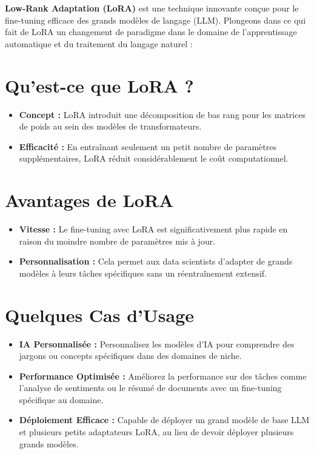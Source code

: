 \documentclass[
  letterpaper,
  DIV=11,
  numbers=noendperiod]{scrreprt}
\providecommand{\tightlist}{%
  \setlength{\itemsep}{0pt}\setlength{\parskip}{0pt}}\usepackage{longtable,booktabs,array}
\begin{document}
\textbf{Low-Rank Adaptation (LoRA)} est une technique innovante conçue
pour le fine-tuning efficace des grands modèles de langage (LLM).
Plongeons dans ce qui fait de LoRA un changement de paradigme dans le
domaine de l'apprentissage automatique et du traitement du langage
naturel :

\section{Qu'est-ce que LoRA ?}\label{quest-ce-que-lora}

\begin{itemize}
\tightlist
\item
  \textbf{Concept :} LoRA introduit une décomposition de bas rang pour
  les matrices de poids au sein des modèles de transformateurs.
\item
  \textbf{Efficacité :} En entraînant seulement un petit nombre de
  paramètres supplémentaires, LoRA réduit considérablement le coût
  computationnel.
\end{itemize}

\section{Avantages de LoRA}\label{avantages-de-lora}

\begin{itemize}
\tightlist
\item
  \textbf{Vitesse :} Le fine-tuning avec LoRA est significativement plus
  rapide en raison du moindre nombre de paramètres mis à jour.
\item
  \textbf{Personnalisation :} Cela permet aux data scientists d'adapter
  de grands modèles à leurs tâches spécifiques sans un réentraînement
  extensif.
\end{itemize}

\section{Quelques Cas d'Usage}\label{quelques-cas-dusage}

\begin{itemize}
\tightlist
\item
  \textbf{IA Personnalisée :} Personnalisez les modèles d'IA pour
  comprendre des jargons ou concepts spécifiques dans des domaines de
  niche.
\item
  \textbf{Performance Optimisée :} Améliorez la performance sur des
  tâches comme l'analyse de sentiments ou le résumé de documents avec un
  fine-tuning spécifique au domaine.
\item
  \textbf{Déploiement Efficace :} Capable de déployer un grand modèle de
  base LLM et plusieurs petits adaptateurs LoRA, au lieu de devoir
  déployer plusieurs grands modèles.
\end{itemize}
\end{document}
